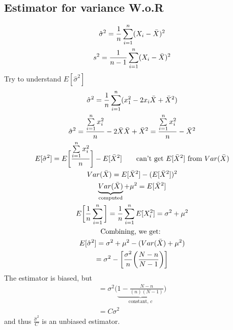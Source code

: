 \subsection*{Estimator for variance W.o.R}
\begin{gather*}
	\hat{\sigma}^2 = \frac{1}{n} \sum_{i = 1}^n (X_i - \bar{X})^2\\
	s^2 = \frac{1}{n-1} \sum_{i = 1}^n (X_i - \bar{X})^2
\end{gather*}
Try to understand $E[\hat{\sigma}^2]$
\begin{gather*}
	\hat{\sigma}^2 = \frac{1}{n} \sum_{i = 1}^n (x_1^2 -2x_i \bar{X} + \bar{X}^2)\\
	\hat{\sigma}^2 = \frac{\sum\limits_{i=1}^n x_i^2}{n} - 2\bar{X} \bar{X}	 + \bar{X}^2 = \frac{\sum\limits_{i=1}^n x_i^2}{n} - \bar{X}^2\\
	E[\hat{\sigma}^2] = E \bigg[\frac{\sum\limits_{i=1}^n x_i^2}{n}\bigg] - E[\bar{X}^2] \qquad \text{can't get $E[\bar{X}^2]$ from $Var(\bar{X})$}\\
	Var(\bar{X}) = E[\bar{X}^2] - (E[\bar{X}^2])^2\\
	\underbrace{Var(\bar{X})}_{\text{computed}} + \mu^2 = E[\bar{X}^2]\\
	E \bigg[\frac{1}{n} \sum_{i=1}^n \bigg] = \frac{1}{n} \sum_{i=1}^n E[X_i^2] = \sigma^2 + \mu^2\\
	\text{Combining, we get: }\\
	E[\hat{\sigma}^2] = \sigma^2 + \mu^2 - (Var(\bar{X}) + \mu^2)\\
	= \sigma^2 - \bigg[\frac{\sigma^2}{n} \bigg(\frac{N-n}{N-1} \bigg) \bigg]
\end{gather*}
The estimator is biased, but
\begin{gather*}
	= \sigma^2 \bigg(\underbrace{1 - \frac{N-n}{(n)(N-1)}}_{\text{constant, }c} \bigg)\\
	= C \sigma^2
\end{gather*}
and thus $\frac{\hat{\sigma}^2}{C}$ is an unbiased estimator.
